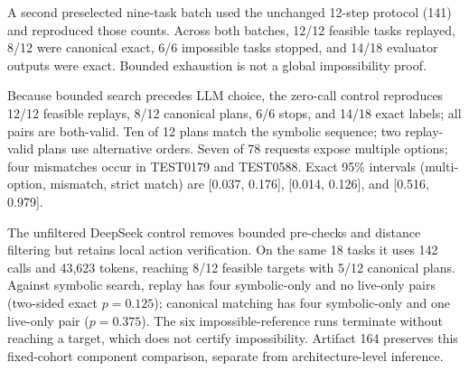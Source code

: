 A second preselected nine-task batch used the unchanged 12-step protocol (141) and reproduced those counts. Across both batches, 12/12 feasible tasks replayed, 8/12 were canonical exact, 6/6 impossible tasks stopped, and 14/18 evaluator outputs were exact. Bounded exhaustion is not a global impossibility proof.

Because bounded search precedes LLM choice, the zero-call control reproduces 12/12 feasible replays, 8/12 canonical plans, 6/6 stops, and 14/18 exact labels; all pairs are both-valid. Ten of 12 plans match the symbolic sequence; two replay-valid plans use alternative orders. Seven of 78 requests expose multiple options; four mismatches occur in TEST0179 and TEST0588. Exact 95\% intervals (multi-option, mismatch, strict match) are [0.037, 0.176], [0.014, 0.126], and [0.516, 0.979].

The unfiltered DeepSeek control removes bounded pre-checks and distance filtering but retains local action verification. On the same 18 tasks it uses 142 calls and 43,623 tokens, reaching 8/12 feasible targets with 5/12 canonical plans. Against symbolic search, replay has four symbolic-only and no live-only pairs (two-sided exact $p=0.125$); canonical matching has four symbolic-only and one live-only pair ($p=0.375$). The six impossible-reference runs terminate without reaching a target, which does not certify impossibility. Artifact 164 preserves this fixed-cohort component comparison, separate from architecture-level inference.


